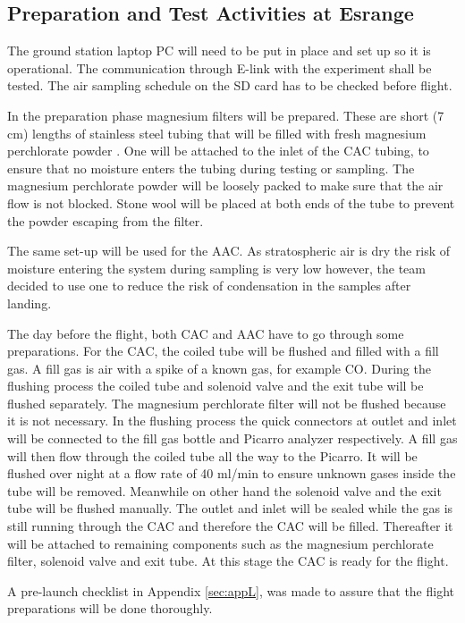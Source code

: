 \documentclass[a4paper,12pt,twoside]{article}
\begin{document}
\subsection{Preparation and Test Activities at Esrange}\label{prep_for_Esrange}
The ground station laptop PC will need to be put in place and set up so it is operational. The communication through E-link with the experiment shall be tested. The air sampling schedule on the SD card has to be checked before flight.

In the preparation phase magnesium filters will be prepared. These are short (7 cm) lengths of stainless steel tubing that will be filled with fresh magnesium perchlorate powder \cite{Karion}. One will be attached to the inlet of the CAC tubing, to ensure that no moisture enters the tubing during testing or sampling. The magnesium perchlorate powder will be loosely packed to make sure that the air flow is not blocked. Stone wool will be placed at both ends of the tube to prevent the powder escaping from the filter.

The same set-up will be used for the AAC. As stratospheric air is dry the risk of moisture entering the system during sampling is very low however, the team decided to use one to reduce the risk of condensation in the samples after landing. 

The day before the flight, both CAC and AAC have to go through some preparations. For the CAC, the coiled tube will be flushed and filled with a fill gas. A fill gas is air with a spike of a known gas, for example CO. During the flushing process the coiled tube and solenoid valve and the exit tube will be flushed separately. The magnesium perchlorate filter will not be flushed because it is not necessary. In the flushing process the quick connectors at outlet and inlet will be connected to the fill gas bottle and Picarro analyzer respectively. A fill gas will then flow through the coiled tube all the way to the Picarro. It will be flushed over night at a flow rate of 40 ml/min to ensure unknown gases inside the tube will be removed. Meanwhile on other hand the solenoid valve and the exit tube will be flushed manually. The outlet and inlet will be sealed while the gas is still running through the CAC and therefore the CAC will be filled. Thereafter it will be attached to remaining components such as the magnesium perchlorate filter, solenoid valve and exit tube. At this stage the CAC is ready for the flight. 

A pre-launch checklist in Appendix \ref{sec:appL}, was made to assure that the flight preparations will be done thoroughly. 
\end{document}
